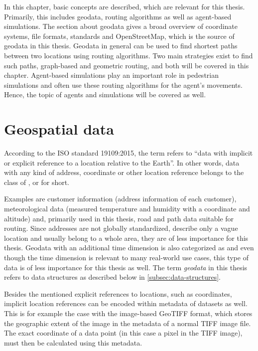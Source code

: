 
In this chapter, basic concepts are described, which are relevant for this thesis.
Primarily, this includes geodata, routing algorithms as well as agent-based simulations.
The section about geodata gives a broad overview of coordinate systems, file formats, standards and OpenStreetMap, which is the source of geodata in this thesis.
Geodata in general can be used to find shortest paths between two locations using routing algorithms.
Two main strategies exist to find such paths, graph-based and geometric routing, and both will be covered in this chapter.
Agent-based simulations play an important role in pedestrian simulations and often use these routing algorithms for the agent's movements.
Hence, the topic of agents and simulations will be covered as well.

\section{Geospatial data}

	According to the ISO standard 19109:2015\cite{iso-19109}, the term  refers to \enquote{data with implicit or explicit reference to a location relative to the Earth}.
	In other words, data with any kind of address, coordinate or other location reference belongs to the class of , or  for short.
	
	Examples are customer information (address information of each customer), meteorological data (measured temperature and humidity with a coordinate and altitude) and, primarily used in this thesis, road and path data suitable for routing.
	Since addresses are not globally standardized, describe only a vague location and usually belong to a whole area, they are of less importance for this thesis.
	Geodata with an additional time dimension is also categorized as \cite{iso-19108} and even though the time dimension is relevant to many real-world use cases, this type of data is of less importance for this thesis as well.
	The term \emph{geodata} in this thesis refers to data structures as described below in \cref{subsec:data-structures}.
	
	Besides the mentioned explicit references to locations, such as coordinates, implicit location references can be encoded within metadata of datasets as well.
	This is for example the case with the image-based GeoTIFF format, which stores the geographic extent of the image in the metadata of a normal TIFF image file\cite{ogc-geotiff}.
	The exact coordinate of a data point (in this case a pixel in the TIFF image), must then be calculated using this metadata.

